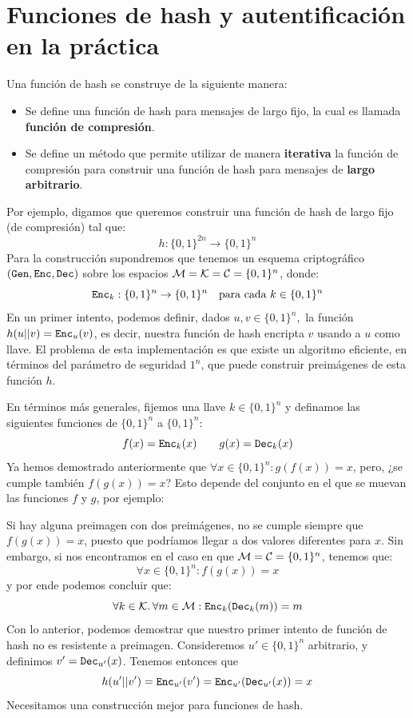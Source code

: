 \section[F. de hash y autentificación en la práctica]{Funciones de hash y autentificación en la práctica}
Una función de hash se construye de la siguiente manera:
\begin{itemize}
    \item Se define una función de hash para mensajes de largo fijo, la cual es llamada \textbf{función de compresión}.
    \item Se define un método que permite utilizar de manera \textbf{iterativa} la función de compresión para construir una función de hash para mensajes de \textbf{largo arbitrario}.
\end{itemize}

Por ejemplo, digamos que queremos construir una función de hash de largo fijo (de compresión) tal que:
$$
h:\{0,1\}^{2n} \to \{0,1\}^n
$$
Para la construcción supondremos que tenemos un esquema criptográfico $(\texttt{Gen}, \texttt{Enc}, \texttt{Dec})$ sobre los espacios $\mathcal{M} = \mathcal{K} = \mathcal{C} = \{0,1\}^n$, donde:
$$
\texttt{Enc}_k:\{0,1\}^n \to \{0,1\}^n \quad \text{para cada } k \in \{0,1\}^n
$$
En un primer intento, podemos definir, dados $u,v \in \{0,1\}^n,$ la función $h(u||v) = \texttt{Enc}_u(v)$, es decir, nuestra función de hash encripta $v$ usando a $u$ como llave. El problema de esta implementación es que existe un algoritmo eficiente, en términos del parámetro de seguridad $1^n$, que puede construir preimágenes de esta función $h$. \medbreak

En términos más generales, fijemos una llave $k \in \{0,1\}^n$ y definamos las siguientes funciones de $\{0,1\}^n$ a $\{0,1\}^n$:
$$
f(x) = \texttt{Enc}_k(x) \qquad g(x) = \texttt{Dec}_k(x)
$$
Ya hemos demostrado anteriormente que $\forall x \in \{0,1\}^n: g(f(x)) = x$, pero, ¿se cumple también $f(g(x)) = x$? Esto depende del conjunto en el que se muevan las funciones $f$ y $g$, por ejemplo:

Si hay alguna preimagen con dos preimágenes, no se cumple siempre que $f(g(x)) = x$, puesto que podríamos llegar a dos valores diferentes para $x$. Sin embargo, si nos encontramos en el caso en que $\mathcal{M} = \mathcal{C} = \{0,1\}^n$, tenemos que:
$$
\forall x \in \{0,1\}^n: f(g(x)) = x
$$
y por ende podemos concluir que:
$$
\forall k \in \mathcal{K}.\,\forall m \in \mathcal{M}: \texttt{Enc}_k(\texttt{Dec}_k(m)) = m
$$
Con lo anterior, podemos demostrar que nuestro primer intento de función de hash no es resistente a preimagen. Consideremos $u' \in \{0,1\}^n$ arbitrario, y definimos $v' = \texttt{Dec}_{u'}(x)$. Tenemos entonces que
$$
h(u'||v') = \texttt{Enc}_{u'}(v') = \texttt{Enc}_{u'}(\texttt{Dec}_{u'}(x)) = x
$$
Necesitamos una construcción mejor para funciones de hash.

